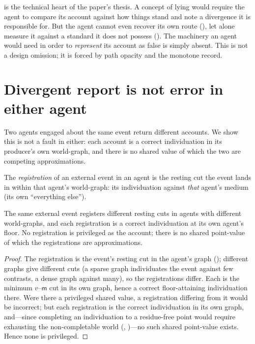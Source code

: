 \documentclass[11pt,twocolumn,a4paper]{article}
\newcommand{\med}{\mathsf{m}}
\begin{document}
\begin{remark}
\label{rem:crux}
 is the technical heart of the paper's thesis. A concept
of lying would require the agent to compare its account against how things
stand and note a divergence it is responsible for. But the agent cannot even
recover its own route (), let alone measure it
against a standard it does not possess (). The machinery an
agent would need in order to \emph{represent} its account as false is simply
absent. This is not a design omission; it is forced by path opacity and the
monotone record.
\end{remark}

\section{Divergent report is not error in either agent}
\label{sec:divergence}

Two agents engaged about the same event return different accounts. We show
this is not a fault in either: each account is a correct individuation in
its producer's own world-graph, and there is no shared value of which the
two are competing approximations.

\begin{definition}[Registration]
\label{def:registration}
The \emph{registration} of an external event in an agent is the resting cut
the event lands in within that agent's world-graph: its individuation
against \emph{that} agent's medium (its own ``everything else'').
\end{definition}

\begin{theorem}
\label{thm:receiverrel}
The same external event registers different resting cuts in agents with
different world-graphs, and each registration is a correct individuation at
its own agent's floor. No registration is privileged as the account; there
is no shared point-value of which the registrations are approximations.
\end{theorem}

\begin{proof}
The registration is the event's resting cut in the agent's graph
(); different graphs give different cuts (a sparse
graph individuates the event against few contrasts, a dense graph against
many), so the registrations differ. Each is the minimum $v$--$\med$ cut in
its own graph, hence a correct floor-attaining individuation there. Were
there a privileged shared value, a registration differing from it would be
incorrect; but each registration is the correct individuation in its own
graph, and---since completing an individuation to a residue-free point would
require exhausting the non-completable world
(, )---no such shared
point-value exists. Hence none is privileged.
\end{proof}
\end{document}
